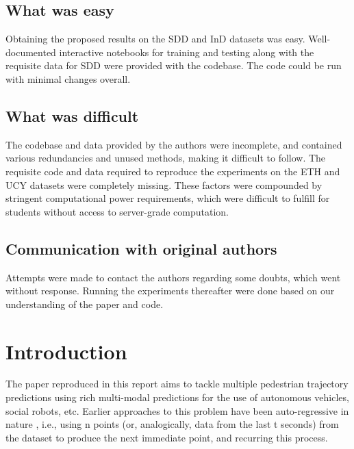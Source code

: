 \subsection*{What was easy}

Obtaining the proposed results on the SDD and InD datasets was easy. Well-documented interactive notebooks for training and testing along with the requisite data for SDD were provided with the codebase. The code could be run with minimal changes overall.

\subsection*{What was difficult}

The codebase and data provided by the authors were incomplete, and contained various redundancies and unused methods, making it difficult to follow. The requisite code and data required to reproduce the experiments on the ETH and UCY datasets were completely missing. These factors were compounded by stringent computational power requirements, which were difficult to fulfill for students without access to server-grade computation.

\subsection*{Communication with original authors}

Attempts were made to contact the authors regarding some doubts, which went without response. Running the experiments thereafter were done based on our understanding of the paper and code.
\newpage

\section{Introduction}

The paper reproduced in this report aims to tackle multiple pedestrian trajectory predictions using rich multi-modal predictions for the use of autonomous vehicles, social robots, etc. Earlier approaches to this problem have been auto-regressive in nature \cite{bhattacharyya2020conditional}\cite{mangalam2020disentangling}\cite{salzmann2021trajectron}, i.e., using n points (or, analogically, data from the last t seconds) from the dataset to produce the next immediate point, and recurring this process. 

